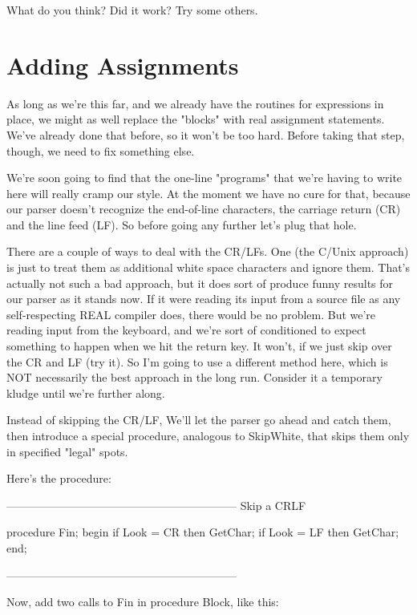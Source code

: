 \documentclass[float=false, crop=false]{standalone}
\begin{document}
What do you think?  Did it work?  Try some others.

\section{Adding Assignments}

As long as we're this far, and we already have the routines for expressions in
place, we might as well replace the "blocks" with real assignment statements.
We've already done that before, so it won't be too hard. Before taking that
step, though, we need to fix something else.

We're soon going to find that the one-line "programs" that we're having to write
here will really cramp our style. At the moment we have no cure for that,
because our parser doesn't recognize the end-of-line characters, the carriage
return (CR) and the line feed (LF). So before going any further let's plug that
hole.

There are a couple of ways to deal with the CR/LFs. One (the C/Unix approach) is
just to treat them as additional white space characters and ignore them. That's
actually not such a bad approach, but it does sort of produce funny results for
our parser as it stands now. If it were reading its input from a source file as
any self-respecting REAL compiler does, there would be no problem. But we're
reading input from the keyboard, and we're sort of conditioned to expect
something to happen when we hit the return key. It won't, if we just skip over
the CR and LF (try it). So I'm going to use a different method here, which is
NOT necessarily the best approach in the long run. Consider it a temporary
kludge until we're further along.

Instead of skipping the CR/LF, We'll let the parser go ahead and catch them,
then introduce a special procedure, analogous to SkipWhite, that skips them only
in specified "legal" spots.

Here's the procedure:

\begin{code}
{--------------------------------------------------------------}
{ Skip a CRLF }

procedure Fin;
begin
   if Look = CR then GetChar;
   if Look = LF then GetChar;
end;

{--------------------------------------------------------------}
\end{code}

Now, add two calls to Fin in procedure Block, like this:
\end{document}
